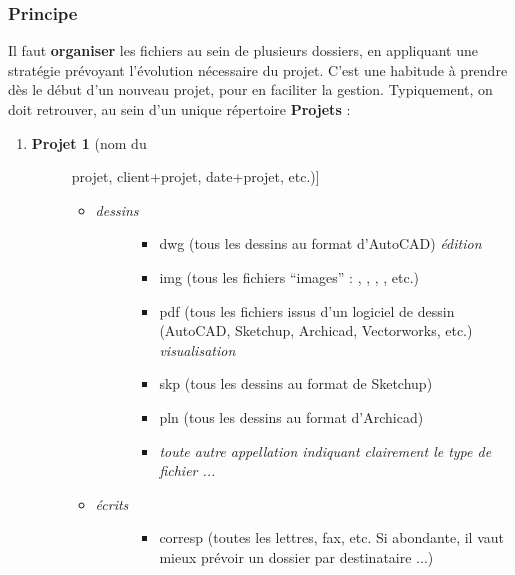\documentclass[a4paper,12pt,french]{sphinxmanual}
\begin{document}
\subsubsection{Principe}
\label{init_su+acad/002_demarrage:principe}
Il faut \textbf{organiser} les fichiers au sein de plusieurs dossiers, en appliquant
une stratégie prévoyant l'évolution nécessaire du projet. C'est une habitude à
prendre dès le début d'un nouveau projet, pour en faciliter la gestion.
Typiquement, on doit retrouver, au sein d'un unique répertoire \textbf{Projets} :
\begin{enumerate}
\item {} \begin{description}
\item[{\textbf{Projet 1} (nom du}] \leavevmode{[}projet, client+projet, date+projet, etc.){]}\begin{itemize}
\item {} \begin{description}
\item[{\emph{dessins}}] \leavevmode\begin{itemize}
\item {} 
dwg (tous les dessins au format   d'AutoCAD) \emph{édition}

\item {} 
img (tous les fichiers ``images'' : , , , , etc.)

\item {} 
pdf (tous les fichiers  issus d'un logiciel de dessin (AutoCAD, Sketchup, Archicad, Vectorworks, etc.) \emph{visualisation}

\item {} 
skp (tous les dessins au format  de Sketchup)

\item {} 
pln (tous les dessins au format  d'Archicad)

\item {} 
\emph{toute autre appellation indiquant clairement le type de fichier ...}

\end{itemize}

\end{description}

\item {} \begin{description}
\item[{\emph{écrits}}] \leavevmode\begin{itemize}
\item {} 
corresp (toutes les lettres, fax, etc. Si abondante, il vaut mieux prévoir un dossier par destinataire ...)


\end{itemize}
\end{description}
\end{itemize}
\end{description}
\end{enumerate}
\end{document}
